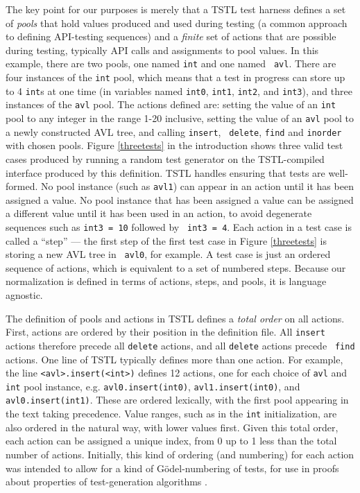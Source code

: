 The key point for our purposes is merely that a TSTL test harness
defines a set of \emph{pools} that hold values produced and used
during testing \cite{AndrewsTR} (a common approach to defining
API-testing sequences) and a \emph{finite} set of actions that are possible during
testing, typically API calls and assignments to pool values.  In this
example, there are two pools, one named {\tt int} and one named {\tt
  avl}.  There are four instances of the {\tt int} pool, which means
that a test in progress can store up to 4 {\tt int}s at one time (in
variables named {\tt int0}, {\tt int1}, {\tt int2}, and {\tt int3}), and three
instances of the {\tt avl} pool.  The actions defined are: setting
the value of an {\tt int} pool to any integer in the range 1-20
inclusive, setting the value of an {\tt avl} pool to a newly
constructed AVL tree, and calling {\tt insert}, {\tt
  delete}, {\tt find} and {\tt inorder} with chosen pools.  Figure
\ref{threetests} in the introduction shows three
valid test cases produced by running a random test generator on
the TSTL-compiled interface produced by this definition.  TSTL handles
ensuring that tests are well-formed. No pool instance
(such as {\tt avl1}) can appear in an action until it has been assigned
a value.  No pool instance that has been assigned a value can be
assigned a different value until it has been used in an action, to
avoid degenerate sequences such as {\tt int3 = 10} followed by {\tt
  int3 = 4}.  Each action in a test case is called a ``step'' --- the
first step of the first test case in Figure \ref{threetests} is storing a new AVL tree in {\tt
  avl0}, for example.  A test case is just an ordered sequence of
actions, which is equivalent to a set of numbered steps.  Because our
normalization is defined in terms of actions, steps, and pools, it is
language agnostic.

The definition of pools and actions in TSTL defines a \emph{total
  order} on all actions.  First, actions are ordered by their position
in the definition file.  All {\tt insert} actions therefore precede
all {\tt delete} actions, and all {\tt delete} actions precede {\tt
  find} actions.  One line of TSTL typically defines more than one action. For
example, the line {\tt <avl>.insert(<int>)} defines 12 actions, one
for each choice of {\tt avl} and {\tt int} pool instance, e.g.
{\tt avl0.insert(int0)}, {\tt avl1.insert(int0)}, and {\tt
  avl0.insert(int1)}.  These are
ordered lexically, with the first pool appearing in the text taking
precedence.  Value ranges, such as in the {\tt int} initialization, are also
ordered in the natural way, with lower values first.  Given this total
order, each action can be assigned a unique index, from 0 up to 1 less
than the total number of actions. Initially, this kind of ordering (and
numbering) for each action was intended to allow for a kind of
G\"odel-numbering of tests, for use in proofs about
properties of test-generation algorithms
\cite{AndrewsTR}.

